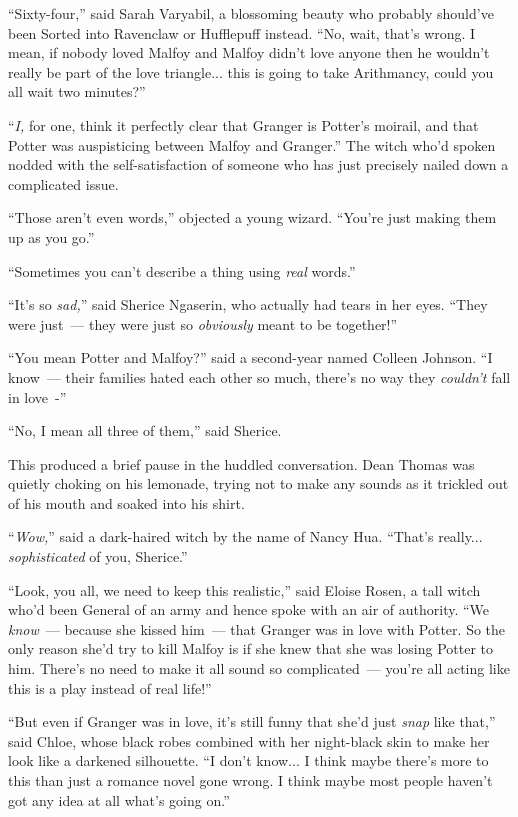 ``Sixty-four,'' said Sarah Varyabil, a blossoming beauty who probably should've been Sorted into Ravenclaw or Hufflepuff instead. ``No, wait, that's wrong. I mean, if nobody loved Malfoy and Malfoy didn't love anyone then he wouldn't really be part of the love triangle... this is going to take Arithmancy, could you all wait two minutes?''

``\emph{I,} for one, think it perfectly clear that Granger is Potter's moirail, and that Potter was auspisticing between Malfoy and Granger.'' The witch who'd spoken nodded with the self-satisfaction of someone who has just precisely nailed down a complicated issue.

``Those aren't even words,'' objected a young wizard. ``You're just making them up as you go.''

``Sometimes you can't describe a thing using \emph{real} words.''

``It's so \emph{sad,}'' said Sherice Ngaserin, who actually had tears in her eyes. ``They were just~--- they were just so \emph{obviously} meant to be together!''

``You mean Potter and Malfoy?'' said a second-year named Colleen Johnson. ``I know~--- their families hated each other so much, there's no way they \emph{couldn't} fall in love~-''

``No, I mean all three of them,'' said Sherice.

This produced a brief pause in the huddled conversation. Dean Thomas was quietly choking on his lemonade, trying not to make any sounds as it trickled out of his mouth and soaked into his shirt.

``\emph{Wow,}'' said a dark-haired witch by the name of Nancy Hua. ``That's really... \emph{sophisticated} of you, Sherice.''

``Look, you all, we need to keep this realistic,'' said Eloise Rosen, a tall witch who'd been General of an army and hence spoke with an air of authority. ``We \emph{know}~--- because she kissed him~--- that Granger was in love with Potter. So the only reason she'd try to kill Malfoy is if she knew that she was losing Potter to him. There's no need to make it all sound so complicated~--- you're all acting like this is a play instead of real life!''

``But even if Granger was in love, it's still funny that she'd just \emph{snap} like that,'' said Chloe, whose black robes combined with her night-black skin to make her look like a darkened silhouette. ``I don't know... I think maybe there's more to this than just a romance novel gone wrong. I think maybe most people haven't got any idea at all what's going on.''

